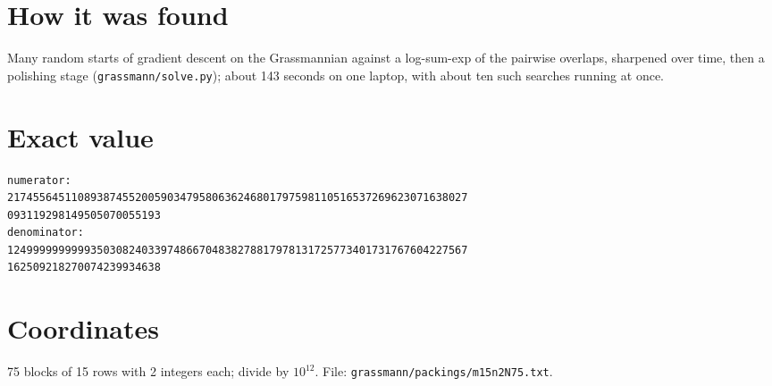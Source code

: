\documentclass[11pt,a4paper]{article}
\begin{document}
\section{How it was found}
Many random starts of gradient descent on the Grassmannian against a log-sum-exp of the pairwise overlaps, sharpened over time, then a polishing stage (\texttt{grassmann/solve.py}); about 143 seconds on one laptop, with about ten such searches running at once.


\appendix
\section{Exact value}
{\small
\begin{verbatim}
numerator:
217455645110893874552005903479580636246801797598110516537269623071638027
093119298149505070055193
denominator:
124999999999935030824033974866704838278817978131725773401731767604227567
162509218270074239934638
\end{verbatim}}

\section{Coordinates}
75 blocks of 15 rows with 2 integers each; divide by $10^{12}$. File: \texttt{grassmann/packings/m15n2N75.txt}.
{\tiny
\begin{multicols}{4}
\end{multicols}}
\end{document}
